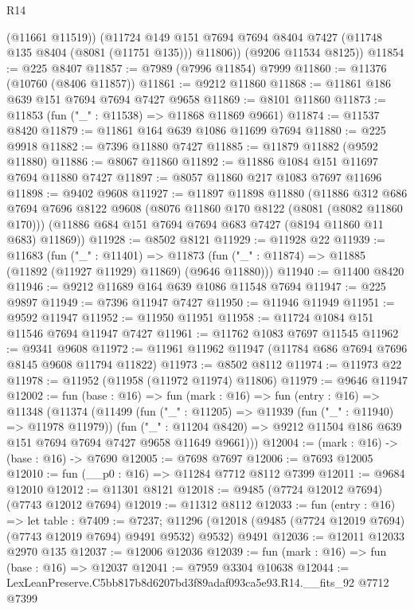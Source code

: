 \begin{lexlean}{R14}
\begin{coremodule}
          (@11661 @11519))
        (@11724 @149 @151 @7694 @7694 @8404 @7427 (@11748 @135 @8404 (@8081 (@11751 @135))) @11806))
      (@9206 @11534 @8125))
@11854 := @225 @8407
@11857 := @7989 (@7996 @11854) @7999
@11860 := @11376 (@10760 (@8406 @11857))
@11861 := @9212 @11860
@11868 := @11861 @186 @639 @151 @7694 @7694 @7427 @9658
@11869 := @8101 @11860
@11873 := @11853 (fun ("_" : @11538) => @11868 @11869 @9661)
@11874 := @11537 @8420
@11879 := @11861 @164 @639 @1086 @11699 @7694
@11880 := @225 @9918
@11882 := @7396 @11880 @7427
@11885 := @11879 @11882 (@9592 @11880)
@11886 := @8067 @11860
@11892 := @11886 @1084 @151 @11697 @7694 @11880 @7427
@11897 := @8057 @11860 @217 @1083 @7697 @11696
@11898 := @9402 @9608
@11927 := @11897
    @11898
    @11880
    (@11886
      @312
      @686
      @7694
      @7696
      @8122
      @9608
      (@8076 @11860 @170 @8122 (@8081 (@8082 @11860 @170)))
      (@11886 @684 @151 @7694 @7694 @683 @7427 (@8194 @11860 @11 @683) @11869))
@11928 := @8502 @8121
@11929 := @11928 @22
@11939 := @11683
    (fun ("_" : @11401) =>
    @11873 (fun ("_" : @11874) => @11885 (@11892 (@11927 @11929) @11869) (@9646 @11880)))
@11940 := @11400 @8420
@11946 := @9212 @11689 @164 @639 @1086 @11548 @7694
@11947 := @225 @9897
@11949 := @7396 @11947 @7427
@11950 := @11946 @11949
@11951 := @9592 @11947
@11952 := @11950 @11951
@11958 := @11724 @1084 @151 @11546 @7694 @11947 @7427
@11961 := @11762 @1083 @7697 @11545
@11962 := @9341 @9608
@11972 := @11961 @11962 @11947 (@11784 @686 @7694 @7696 @8145 @9608 @11794 @11822)
@11973 := @8502 @8112
@11974 := @11973 @22
@11978 := @11952 (@11958 (@11972 @11974) @11806)
@11979 := @9646 @11947
@12002 := fun (base : @16) =>
  fun (mark : @16) =>
  fun (entry : @16) =>
  @11348
    (@11374
      (@11499
        (fun ("_" : @11205) => @11939 (fun ("_" : @11940) => @11978 @11979))
        (fun ("_" : @11204 @8420) =>
        @9212 @11504 @186 @639 @151 @7694 @7694 @7427 @9658 @11649 @9661)))
@12004 := (mark : @16) -> (base : @16) -> @7690
@12005 := @7698 @7697
@12006 := @7693 @12005
@12010 := fun (__p0 : @16) => @11284 @7712 @8112 @7399
@12011 := @9684 @12010
@12012 := @11301 @8121
@12018 := @9485 (@7724 @12012 @7694) (@7743 @12012 @7694)
@12019 := @11312 @8112
@12033 := fun (entry : @16) =>
  let table : @7409 := @7237;
  @11296 (@12018 (@9485 (@7724 @12019 @7694) (@7743 @12019 @7694) @9491 @9532) @9532) @9491
@12036 := @12011 @12033 @2970 @135
@12037 := @12006 @12036
@12039 := fun (mark : @16) => fun (base : @16) => @12037
@12041 := @7959 @3304 @10638
@12044 := LexLeanPreserve.C5bb817b8d6207bd3f89adaf093ca5e93.R14.__fits_92 @7712 @7399

\end{coremodule}
\end{lexlean}
